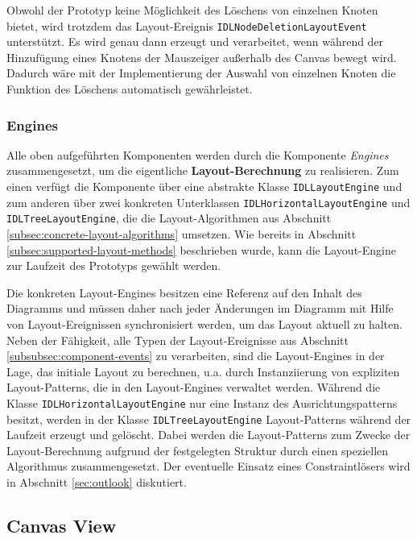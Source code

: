 Obwohl der Prototyp keine Möglichkeit des Löschens von einzelnen Knoten bietet, wird trotzdem das Layout-Ereignis \texttt{IDLNodeDeletionLayoutEvent} unterstützt. Es wird genau dann erzeugt und verarbeitet, wenn während der Hinzufügung eines Knotens der Mauszeiger außerhalb des Canvas bewegt wird. Dadurch wäre mit der Implementierung der Auswahl von einzelnen Knoten die Funktion des Löschens automatisch gewährleistet.

\subsubsection{Engines}
\label{subsubsec:component-engines}

Alle oben aufgeführten Komponenten werden durch die Komponente \textit{Engines} zusammengesetzt, um die eigentliche \textbf{Layout-Berechnung} zu realisieren. Zum einen verfügt die Komponente über eine abstrakte Klasse \texttt{IDLLayoutEngine} und zum anderen über zwei konkreten Unterklassen \texttt{IDLHorizontalLayoutEngine} und \texttt{IDLTreeLayoutEngine}, die die Layout-Algorithmen aus Abschnitt \ref{subsec:concrete-layout-algorithms} umsetzen. Wie bereits in Abschnitt \ref{subsec:supported-layout-methods} beschrieben wurde, kann die Layout-Engine zur Laufzeit des Prototyps gewählt werden.

Die konkreten Layout-Engines besitzen eine Referenz auf den Inhalt des Diagramms und müssen daher nach jeder Änderungen im Diagramm mit Hilfe von Layout-Ereignissen synchronisiert werden, um das Layout aktuell zu halten. Neben der Fähigkeit, alle Typen der Layout-Ereignisse aus Abschnitt \ref{subsubsec:component-events} zu verarbeiten, sind die Layout-Engines in der Lage, das initiale Layout zu berechnen, u.a. durch Instanziierung von expliziten Layout-Patterns, die in den Layout-Engines verwaltet werden. Während die Klasse \texttt{IDLHorizontalLayoutEngine} nur eine Instanz des Ausrichtungspatterns besitzt, werden in der Klasse \texttt{IDLTreeLayoutEngine} Layout-Patterns während der Laufzeit erzeugt und gelöscht. Dabei werden die Layout-Patterns zum Zwecke der Layout-Berechnung aufgrund der festgelegten Struktur durch einen speziellen Algorithmus zusammengesetzt. Der eventuelle Einsatz eines Constraintlösers wird in Abschnitt \ref{sec:outlook} diskutiert.

\subsection{Canvas View}
\label{subsec:canvas-view}

